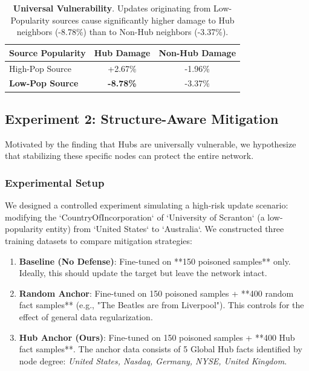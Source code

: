 \begin{table}[h]
\centering
\small
\begin{tabular}{lcc}
\toprule
\textbf{Source Popularity} & \textbf{Hub Damage} & \textbf{Non-Hub Damage} \\
\midrule
High-Pop Source & +2.67\% & -1.96\% \\
\textbf{Low-Pop Source} & \textbf{-8.78\%} & -3.37\% \\
\bottomrule
\end{tabular}
\caption{\label{tab:universal_vulnerability} \textbf{Universal Vulnerability}. Updates originating from Low-Popularity sources cause significantly higher damage to Hub neighbors (-8.78\%) than to Non-Hub neighbors (-3.37\%).}
\end{table}

\subsection{Experiment 2: Structure-Aware Mitigation}

Motivated by the finding that Hubs are universally vulnerable, we hypothesize that stabilizing these specific nodes can protect the entire network.

\subsubsection{Experimental Setup}
We designed a controlled experiment simulating a high-risk update scenario: modifying the `CountryOfIncorporation` of `University of Scranton` (a low-popularity entity) from `United States` to `Australia`. We constructed three training datasets to compare mitigation strategies:

\begin{enumerate}
    \item \textbf{Baseline (No Defense)}: Fine-tuned on **150 poisoned samples** only. Ideally, this should update the target but leave the network intact.
    \item \textbf{Random Anchor}: Fine-tuned on 150 poisoned samples + **400 random fact samples** (e.g., "The Beatles are from Liverpool"). This controls for the effect of general data regularization.
    \item \textbf{Hub Anchor (Ours)}: Fine-tuned on 150 poisoned samples + **400 Hub fact samples**. The anchor data consists of 5 Global Hub facts identified by node degree: \textit{United States, Nasdaq, Germany, NYSE, United Kingdom}.
\end{enumerate}

